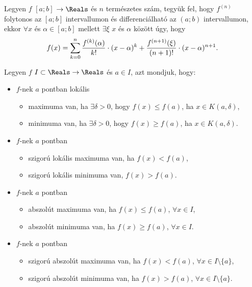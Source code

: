 \begin{theorem}
  Legyen $f$ $[a; b]$ $\rightarrow \Reals $ és $n$ természetes szám, tegyük fel,
  hogy $f^{(n)}$ folytonos az $[a; b]$ intervallumon és differenciálható az
  $(a; b)$ intervallumon, ekkor $\forall x$ és $\alpha \in [a; b]$ mellett
  $\exists \xi$ $x$ és $\alpha$ között úgy, hogy
  \[
    f(x)=\sum\limits_{k=0}^n \frac{f^{(k)}(\alpha)}{k!}\cdot
    (x-\alpha)^k+\frac{f^{(n+1)}(\xi)}{(n+1)!}\cdot (x-\alpha)^{n+1}
    \text.
  \]
\end{theorem}

\begin{definition}
  Legyen $f$ $I \subset \Reals \rightarrow \Reals $ és $a\in I$, azt mondjuk,
  hogy:
  \begin{itemize}
    \item $f$-nek $a$ pontban lokális
          \begin{itemize}
            \item maximuma van, ha $\exists \delta>0$, hogy $f(x)\leq f(a)$, ha
                  $x\in K(a,\delta)$,
            \item minimuma van, ha $\exists \delta>0$, hogy $f(x)\geq f(a)$, ha
                  $x\in K(a,\delta)$.
          \end{itemize}
    \item $f$-nek $a$ pontban
          \begin{itemize}
            \item szigorú lokális maximuma van, ha $f(x)<f(a)$,
            \item szigorú lokális minimuma van, $f(x)>f(a)$.
          \end{itemize}
    \item $f$-nek $a$ pontban
          \begin{itemize}
            \item abszolút maximuma van, ha $f(x)\leq f(a)$, $\forall x\in I$,
            \item abszolút minimuma van, ha $f(x)\geq f(a)$, $\forall x\in I$.
          \end{itemize}
    \item $f$-nek $a$ pontban
          \begin{itemize}
            \item szigorú abszolút maximuma van, ha $f(x)<f(a)$, $\forall x\in I
                    \setminus \{a\}$,
            \item szigorú abszolút minimuma van, ha $f(x)>f(a)$, $\forall x\in I
                    \setminus \{a\}$.
          \end{itemize}
  \end{itemize}
\end{definition}

